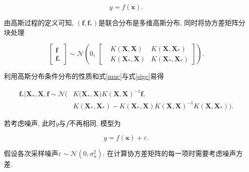                 \begin{equation}
                    y=f(\boldsymbol{x}).
                \end{equation}

                由高斯过程的定义可知, $(\boldsymbol{f}, \boldsymbol{f}_{*})$是联合分布是多维高斯分布, 同时将协方差矩阵分块处理

                \begin{equation}\label{2.35}
                    \left[\begin{aligned}
                        \boldsymbol{f}\ \\
                        \boldsymbol{f}_{*}
                    \end{aligned}\right]
                    \sim\mathcal{N}\left(0,\
                    \begin{bmatrix}
                        &K(\boldsymbol{X}, \boldsymbol{X})     &K(\boldsymbol{X}, \boldsymbol{X}_{*}) \\
                        &K(\boldsymbol{X}_{*}, \boldsymbol{X}) &K(\boldsymbol{X}_{*}, \boldsymbol{X}_{*})
                    \end{bmatrix}\right).
                \end{equation}

                利用高斯分布条件分布的性质和式\ref{muc}与式\ref{sigc}易得

                \begin{equation}
                    \begin{aligned}
                        \boldsymbol{f}_{*}|\boldsymbol{X}_{*},\boldsymbol{X},\boldsymbol{f}\sim\mathcal{N}(&K\bigl(\boldsymbol{X}_{*},\boldsymbol{X})K(\boldsymbol{X},\boldsymbol{X})^{-1}\boldsymbol{f}, \\
                        &K(\boldsymbol{X}_{*},\boldsymbol{X}_{*})-K(\boldsymbol{X}_{*},\boldsymbol{X})K(\boldsymbol{X},\boldsymbol{X})^{-1}K(\boldsymbol{X},\boldsymbol{X}_{*})\bigl).
                    \end{aligned}
                \end{equation}

                若考虑噪声, 此时$y$与$f$不再相同, 模型为

                \begin{equation}
                    y=f(\boldsymbol{x})+\varepsilon.
                \end{equation}

                假设各次采样噪声$\varepsilon\sim\mathcal{N}(0, \sigma^{2}_{n})$. 在计算协方差矩阵的每一项时需要考虑噪声方差.

